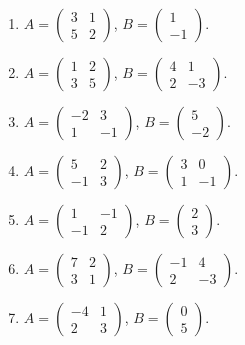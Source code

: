 \begin{enumerate}[label=\arabic*.,  leftmargin=*]
\item $A=\begin{pmatrix}3&1\\5&2\end{pmatrix}$, $B=\begin{pmatrix}1\\-1\end{pmatrix}$.
\item $A=\begin{pmatrix}1&2\\3&5\end{pmatrix}$, $B=\begin{pmatrix}4&1\\2&-3\end{pmatrix}$.
\item $A=\begin{pmatrix}-2&3\\1&-1\end{pmatrix}$, $B=\begin{pmatrix}5\\-2\end{pmatrix}$.
\item $A=\begin{pmatrix}5&2\\-1&3\end{pmatrix}$, $B=\begin{pmatrix}3&0\\1&-1\end{pmatrix}$.
\item $A=\begin{pmatrix}1&-1\\-1&2\end{pmatrix}$, $B=\begin{pmatrix}2\\3\end{pmatrix}$.
\item $A=\begin{pmatrix}7&2\\3&1\end{pmatrix}$, $B=\begin{pmatrix}-1&4\\2&-3\end{pmatrix}$.
\item $A=\begin{pmatrix}-4&1\\2&3\end{pmatrix}$, $B=\begin{pmatrix}0\\5\end{pmatrix}$.

\end{enumerate}
